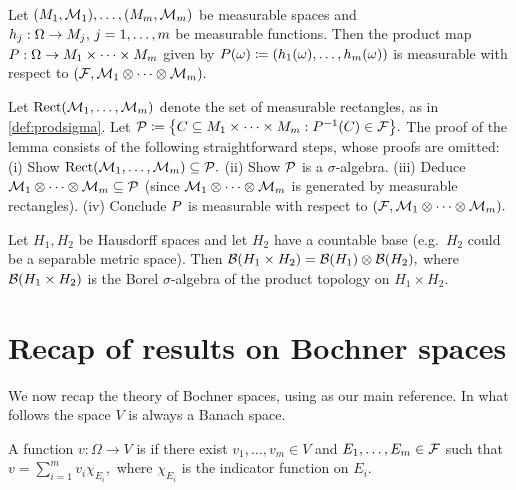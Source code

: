 \label{lem:measprod}

\

\noindent Let $\mleft(\M_1,\FM_1\mright),\ldots,\mleft(\M_m,\FM_m\mright)$ be measurable spaces and $h_j:\Omega \rightarrow M_j,\, j = 1,\ldots,m$ be measurable functions. Then the product map $P:\Omega \rightarrow M_1 \times \cdots \times M_m$ given by
$\Prodf(\omega) \de \mleft(h_1(\omega),\ldots,h_m(\omega)\mright)$
is measurable with respect to $\mleft(\cF,\FM_1 \otimes \cdots\otimes\FM_m\mright).$
\ele


Let $\measrectmany{\FM_1,\ldots,\FM_m}$ denote the set of measurable rectangles, as in \cref{def:prodsigma}. Let %
$\cP \de \set{C \subseteq \M_1 \times \cdots \times \M_m \st \Prodf^{-1}\mleft(C\mright) \in \cF}.$
The proof of the lemma consists of the following straightforward steps, whose proofs are omitted:
(i) Show $\measrectmany{\FM_1,\ldots,\FM_m} \subseteq \cP.$
(ii) Show $\mathcal P$ is a $\sigma$-algebra.
(iii) Deduce $\mathcal M_1 \otimes \cdots \otimes \mathcal M_m \subseteq \mathcal P$ (since $\mathcal M_1 \otimes \cdots \otimes \mathcal M_m$ is generated by measurable rectangles).
(iv) Conclude $P$ is measurable with respect to $\mleft(\cF,\FM_1\otimes\cdots\otimes\FM_m\mright).$
\epf

Let $H_1,H_2$ be Hausdorff spaces and let $H_2$ have a countable base (e.g.~$H_2$ could be a separable metric space). Then $\Borel{H_1\times H_2} = \Borel{H_1} \otimes \Borel{H_2},$ where $\Borel{H_1\times H_2}$ is the Borel $\sigma$-algebra of the product topology on $H_1\times H_2.$\label{lem:bogachev}
\ele

\section{Recap of results on Bochner spaces}

We now recap the theory of Bochner spaces, using \cite{DiUh:77} as our main reference. In what follows the space $V$ is always a Banach space.

A function $v:\Omega \rightarrow V$ is  if there exist $v_1,\ldots,v_m \in V$ and $E_1,\ldots,E_m \in \mathcal F$ such that
$v = \sum_{i=1}^m v_i \chi_{E_{i}},$
where $\chi_{E_{i}}$ is the indicator function on $E_{i}.$
\ede

